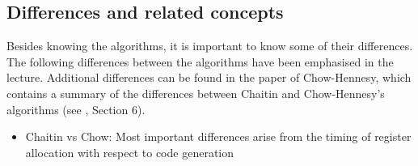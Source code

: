 \documentclass[a4paper,10pt]{article}
\begin{document}
\subsection{Differences and related concepts}
Besides knowing the algorithms, it is important to know some of their differences. The following differences between the algorithms have been emphasised in the lecture. Additional differences can be found in the paper of Chow-Hennesy, which contains a summary of the differences between Chaitin and Chow-Hennesy's algorithms (see \cite{chowhennesy}, Section 6).

\begin{itemize}
	\item Chaitin vs Chow: Most important differences arise from the timing of register allocation with respect to code generation \\


\end{itemize}
\end{document}
